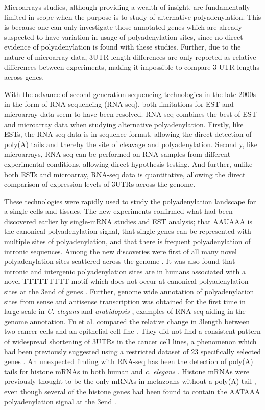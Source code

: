 Microarrays studies, although providing a wealth of insight, are fundamentally
limited in scope when the purpose is to study of alternative polyadenylation.
This is because one can only investigate those annotated genes which are
already suspected to have variation in usage of polyadenylation sites, since no
direct evidence of polyadenylation is found with these studies. Further, due to
the nature of microarray data, 3\p UTR length differences are only reported as
relative differences between experiments, making it impossible to compare 3\p
UTR lengths across genes.

With the advance of second generation sequencing technologies in the late 2000s
in the form of RNA sequencing (RNA-seq), both limitations for EST and
microarray data seem to have been resolved. RNA-seq combines the best of EST
and microarray data when studying alternative polyadenylation. Firstly, like
ESTs, the RNA-seq data is in sequence format, allowing the direct detection
of poly(A) tails and thereby the site of cleavage and polyadenylation.
Secondly, like microarrays, RNA-seq can be performed on RNA samples from
different experimental conditions, allowing direct hypothesis testing. And
further, unlike both ESTs and microarray, RNA-seq data is quantitative,
allowing the direct comparison of expression levels of 3\p UTRs across the
genome.

These technologies were rapidly used to study the polyadenylation landscape for
a single cells and tissues. The new experiments confirmed what had been
discovered earlier by single-mRNA studies and EST analysis; that AAUAAA is the
canonical polyadenylation signal, that single genes can be represented with
multiple sites of polyadenylation, and that there is frequent polyadenylation
of intronic sequences. Among the new discoveries were first of all many novel
polyadenylation sites scattered across the genome
\cite{ozsolak_comprehensive_2010, derti_quantitative_2012}. It was also found
that intronic and intergenic polyadenylation sites are in humans associated
with a novel TTTTTTTTT motif which does not occur at canonical polyadenylation
sites at the 3\p end of genes \cite{ozsolak_comprehensive_2010}. Further,
genome wide annotation of polyadenylation sites from sense and antisense
transcription was obtained for the first time in large scale in \textit{C.
elegans} and \textit{arabidopsis} \cite{mangone_landscape_2010,
wu_genome-wide_2011}, examples of RNA-seq aiding in the genome annotation. Fu
et al. compared the relative change in 3\p length between two cancer cells and
an epithelial cell line \cite{fu_differential_2011}. They did not find a
consistent pattern of widespread shortening of 3\p UTRs in the cancer cell
lines, a phenomenon which had been previously suggested using a restricted
dataset of 23 specifically selected genes \cite{mayr_widespread_2009-2}. An
unexpected finding with RNA-seq has been the detection of poly(A) tails for
histone mRNAs in both human and \textit{c. elegans}
\cite{mangone_landscape_2010-1, shepard_complex_2011}. Histone mRNAs were
previously thought to be the only mRNAs in metazoans without a poly(A) tail
\cite{marzluff_metabolism_2008}, even though several of the histone genes had
been found to contain the AATAAA polyadenylation signal at the 3\p end
\cite{keall_histone_2007}.

